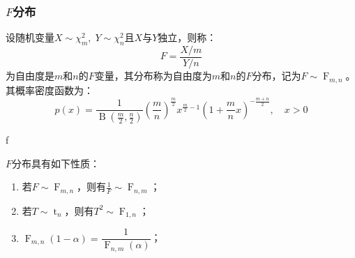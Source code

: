 \subsubsection{$F$分布}
\begin{definition}
	设随机变量$X\sim \chi_m^2,\;Y\sim\chi_n^2$且$X$与$Y$独立，则称：
	\begin{equation*}
		F=\frac{X/m}{Y/n}
	\end{equation*}
	为自由度是$m$和$n$的$F$变量，其分布称为自由度为$m$和$n$的$F$分布，记为$F\sim \operatorname{F}_{m,n}$。
	其概率密度函数为：
	\begin{equation*}
		p(x)=\frac{1}{\operatorname{B}\left(\frac{m}{2},\frac{n}{2}\right)}
		\left(\frac{m}{n}\right)^{\frac{m}{2}}x^{\frac{m}{2}-1}
		\left(1+\frac{m}{n}x\right)^{-\frac{m+n}{2}},\quad x>0
	\end{equation*}
\end{definition}
\begin{densityplot}{f}
	\caption{$F$ 分布 $\operatorname{F}_{5,10}$ 的概率密度函数}
\end{densityplot}
\begin{property}\label{prop:FDistribution}
	$F$分布具有如下性质：
	\begin{enumerate}
		\item 若$F\sim \operatorname{F}_{m,n}$，则有$\frac{1}{F}\sim \operatorname{F}_{n,m}$；
		\item 若$T\sim \operatorname{t}_n$，则有$T^2\sim \operatorname{F}_{1,n}$；
		\item $\operatorname{F}_{m,n}(1-\alpha)=\dfrac{1}{\operatorname{F}_{n,m}(\alpha)}$；
	\end{enumerate}
\end{property}
